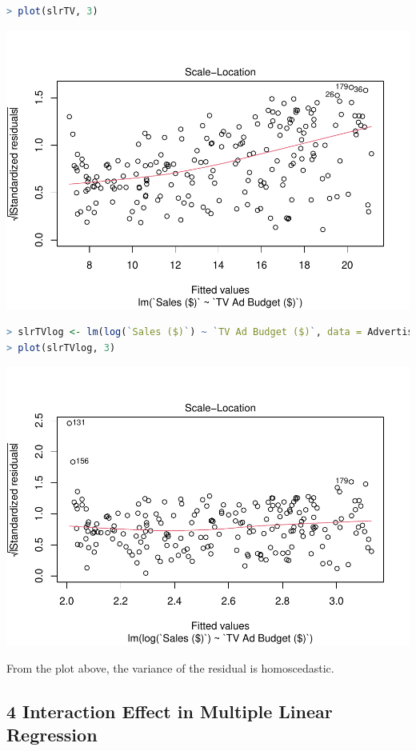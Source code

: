 \documentclass[
]{article}
\begin{document}
\begin{lstlisting}[language=R]
> plot(slrTV, 3)
\end{lstlisting}

\includegraphics{LinearRegression_files/figure-latex/unnamed-chunk-19-1.pdf}

\begin{lstlisting}[language=R]
> slrTVlog <- lm(log(`Sales ($)`) ~ `TV Ad Budget ($)`, data = AdvertisingBudgetandSales)
> plot(slrTVlog, 3)
\end{lstlisting}

\includegraphics{LinearRegression_files/figure-latex/unnamed-chunk-20-1.pdf}

From the plot above, the variance of the residual is homoscedastic.

\hypertarget{interaction-effect-in-multiple-linear-regression}{%
\subsection{4 Interaction Effect in Multiple Linear
Regression}\label{interaction-effect-in-multiple-linear-regression}}
\end{document}
